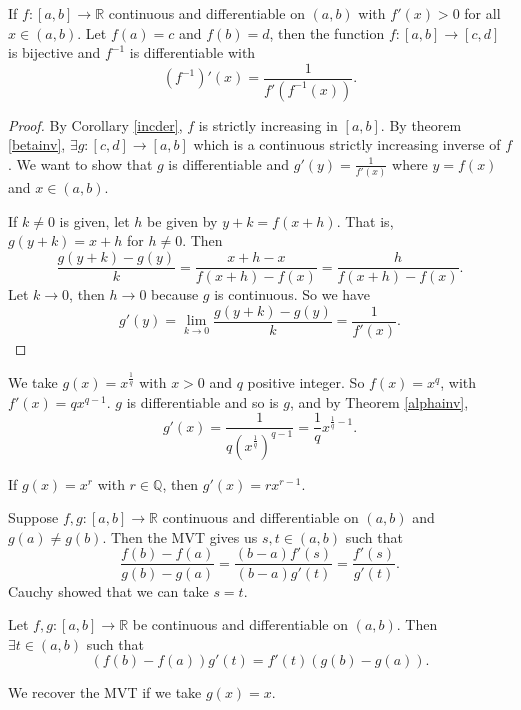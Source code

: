 \begin{theorem}
    \label{alphainv}
    If \(f:[a,b]\to\mathbb{R}\) continuous and differentiable on \((a,b)\) with \(f'(x) >0\) for all \(x \in (a,b)\). Let \(f(a) = c\) and \(f(b) = d\), then the function \(f:[a,b]\to[c,d]\) is bijective and \(f^{-1}\) is differentiable with
    \[
        (f^{-1})'(x) = \frac{1}{f'(f^{-1}(x))}.
    \]
\end{theorem}
\begin{proof}
    By Corollary \eqref{incder}, \(f\) is strictly increasing in \([a,b]\). By theorem \eqref{betainv}, \(\exists g: [c,d] \to [a,b]\) which is a continuous strictly increasing inverse of \(f\). We want to show that \(g\) is differentiable and \(g'(y) = \frac{1}{f'(x)}\) where \(y = f(x)\) and \(x \in (a,b)\).

    If \(k \neq 0\) is given, let \(h\) be given by \(y + k = f(x + h)\). That is, \(g(y + k) = x + h\) for \(h \neq 0\). Then
    \[
        \frac{g(y + k) - g(y)}{k} = \frac{x + h - x}{f(x + h) - f(x)} = \frac{h}{f(x + h) - f(x)}.
    \]
    Let \(k \to 0\), then \(h \to 0\) because \(g\) is continuous. So we have
    \[
        g'(y) = \lim\limits_{k \to 0} \frac{g(y + k) - g(y)}{k} = \frac{1}{f'(x)}.
    \]
\end{proof}
\begin{example}
    We take \(g(x) = x^\frac{1}{q}\) with \(x > 0\) and \(q\) positive integer. So \(f(x) = x^q\), with \(f'(x) = qx^{q-1}\). \(g\) is differentiable and so is \(g\), and by Theorem \eqref{alphainv},
    \[
        g'(x) = \frac{1}{q(x^\frac{1}{q})^{q-1}} = \frac{1}{q}x^{\frac{1}{q} - 1}.
    \]
\end{example}
\begin{remark}
    If \(g(x) = x^r\) with \(r \in \mathbb{Q}\), then \(g'(x) = rx^{r-1}\).
\end{remark}
Suppose \(f,g: [a,b] \to \mathbb{R}\) continuous and differentiable on \((a,b)\) and \(g(a) \neq g(b)\). Then the MVT gives us \(s,t \in (a,b)\) such that
\[
    \frac{f(b) - f(a)}{g(b) - g(a)} = \frac{(b-a)f'(s)}{(b-a)g'(t)}=\frac{f'(s)}{g'(t)}.
\]
Cauchy showed that we can take \(s = t\).
\begin{theorem}
    Let \(f,g: [a,b] \to \mathbb{R}\) be continuous and differentiable on \((a,b)\). Then \(\exists t \in (a,b)\) such that
    \[
        (f(b) - f(a))g'(t) = f'(t)(g(b) - g(a)).
    \]
\end{theorem}
\begin{remark}
    We recover the MVT if we take \(g(x) = x\).
\end{remark}